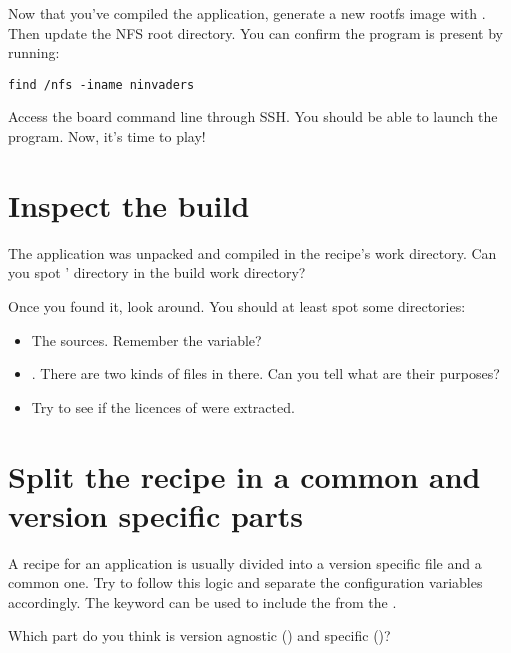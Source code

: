 Now that you've compiled the  application, generate a new
rootfs image with . Then update the
NFS root directory. You can confirm the  program is
present by running:
\begin{verbatim}
find /nfs -iname ninvaders
\end{verbatim}

Access the board command line through SSH. You should be able to
launch the  program. Now, it's time to play!

\section{Inspect the build}

The  application was unpacked and compiled in the
recipe's work directory. Can you spot ' directory in
the build work directory?

Once you found it, look around. You should at least spot some
directories:
\begin{itemize}
    \item The sources. Remember the  variable?
    \item {}. There are two kinds of files in there. Can you
      tell what are their purposes?
    \item Try to see if the licences of  were
      extracted.
\end{itemize}

\section{Split the recipe in a common and version specific parts}

A recipe for an application is usually divided into a version specific 
file and a common one. Try to follow this logic and separate the configuration
variables accordingly. The  keyword can be used to include the
 from the .

Which part do you think is version agnostic () and specific
()?
